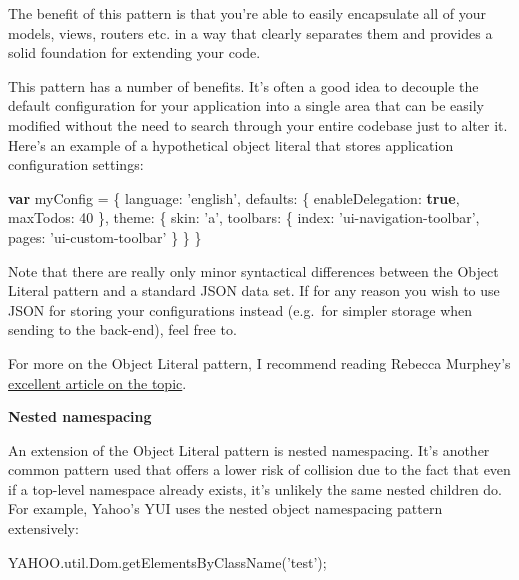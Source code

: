 \documentclass[9pt]{book}
\newenvironment{Shaded}{}{}
\newcommand{\KeywordTok}[1]{\textcolor[rgb]{0.00,0.44,0.13}{\textbf{{#1}}}}
\newcommand{\DataTypeTok}[1]{\textcolor[rgb]{0.56,0.13,0.00}{{#1}}}
\newcommand{\DecValTok}[1]{\textcolor[rgb]{0.25,0.63,0.44}{{#1}}}
\newcommand{\StringTok}[1]{\textcolor[rgb]{0.25,0.44,0.63}{{#1}}}
\newcommand{\OtherTok}[1]{\textcolor[rgb]{0.00,0.44,0.13}{{#1}}}
\newcommand{\FunctionTok}[1]{\textcolor[rgb]{0.02,0.16,0.49}{{#1}}}
\newcommand{\NormalTok}[1]{{#1}}
\begin{document}
The benefit of this pattern is that you're able to easily encapsulate
all of your models, views, routers etc. in a way that clearly separates
them and provides a solid foundation for extending your code.

This pattern has a number of benefits. It's often a good idea to
decouple the default configuration for your application into a single
area that can be easily modified without the need to search through your
entire codebase just to alter it. Here's an example of a hypothetical
object literal that stores application configuration settings:

\begin{Shaded}
\begin{Highlighting}[]
\KeywordTok{var} \NormalTok{myConfig = \{}
  \DataTypeTok{language}\NormalTok{: }\StringTok{'english'}\NormalTok{,}
  \DataTypeTok{defaults}\NormalTok{: \{}
    \DataTypeTok{enableDelegation}\NormalTok{: }\KeywordTok{true}\NormalTok{,}
    \DataTypeTok{maxTodos}\NormalTok{: }\DecValTok{40}
  \NormalTok{\},}
  \DataTypeTok{theme}\NormalTok{: \{}
    \DataTypeTok{skin}\NormalTok{: }\StringTok{'a'}\NormalTok{,}
    \DataTypeTok{toolbars}\NormalTok{: \{}
      \DataTypeTok{index}\NormalTok{: }\StringTok{'ui-navigation-toolbar'}\NormalTok{,}
      \DataTypeTok{pages}\NormalTok{: }\StringTok{'ui-custom-toolbar'}
    \NormalTok{\}}
  \NormalTok{\}}
\NormalTok{\}}
\end{Highlighting}
\end{Shaded}

Note that there are really only minor syntactical differences between
the Object Literal pattern and a standard JSON data set. If for any
reason you wish to use JSON for storing your configurations instead
(e.g.~for simpler storage when sending to the back-end), feel free to.

For more on the Object Literal pattern, I recommend reading Rebecca
Murphey's
\href{http://rmurphey.com/blog/2009/10/15/using-objects-to-organize-your-code}{excellent
article on the topic}.

\textbf{Nested namespacing}

An extension of the Object Literal pattern is nested namespacing. It's
another common pattern used that offers a lower risk of collision due to
the fact that even if a top-level namespace already exists, it's
unlikely the same nested children do. For example, Yahoo's YUI uses the
nested object namespacing pattern extensively:

\begin{Shaded}
\begin{Highlighting}[]
\OtherTok{YAHOO}\NormalTok{.}\OtherTok{util}\NormalTok{.}\OtherTok{Dom}\NormalTok{.}\FunctionTok{getElementsByClassName}\NormalTok{(}\StringTok{'test'}\NormalTok{);}
\end{Highlighting}
\end{Shaded}
\end{document}

